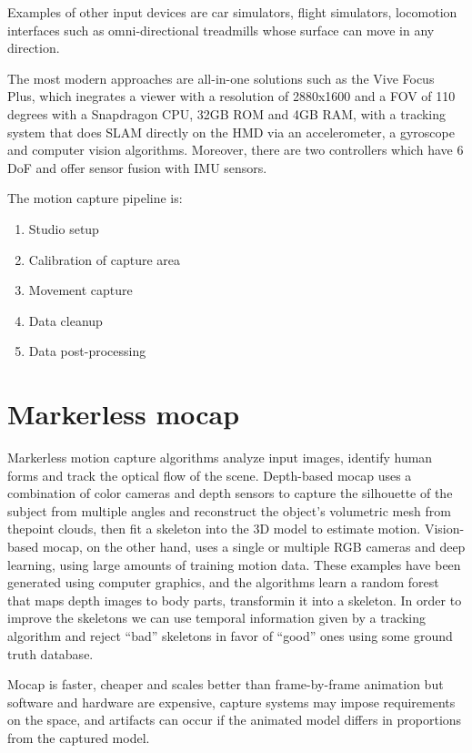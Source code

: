\documentclass[a4paper]{article}
\begin{document}
Examples of other input devices are car simulators, flight simulators,
locomotion interfaces such as omni-directional treadmills whose surface
can move in any direction.

The most modern approaches are all-in-one solutions such as the Vive
Focus Plus, which inegrates a viewer with a resolution of 2880x1600 and
a FOV of 110 degrees with a Snapdragon CPU, 32GB ROM and 4GB RAM, with a
tracking system that does SLAM directly on the HMD via an accelerometer,
a gyroscope and computer vision algorithms.
Moreover, there are two
controllers which have 6 DoF and offer sensor fusion with IMU sensors.

The motion capture pipeline is:

\begin{enumerate}

\item
  Studio setup
\item
  Calibration of capture area
\item
  Movement capture
\item
  Data cleanup
\item
  Data post-processing
\end{enumerate}

\section{Markerless mocap}

Markerless motion capture algorithms analyze input images, identify
human forms and track the optical flow of the scene.
Depth-based mocap
uses a combination of color cameras and depth sensors to capture the
silhouette of the subject from multiple angles and reconstruct the
object's volumetric mesh from thepoint clouds, then fit a skeleton into
the 3D model to estimate motion.
Vision-based mocap, on the other hand,
uses a single or multiple RGB cameras and deep learning, using large
amounts of training motion data.
These examples have been generated
using computer graphics, and the algorithms learn a random forest that
maps depth images to body parts, transformin it into a skeleton.
In
order to improve the skeletons we can use temporal information given by
a tracking algorithm and reject ``bad'' skeletons in favor of ``good''
ones using some ground truth database.

Mocap is faster, cheaper and scales better than frame-by-frame animation
but software and hardware are expensive, capture systems may impose
requirements on the space, and artifacts can occur if the animated model
differs in proportions from the captured model.
\end{document}
